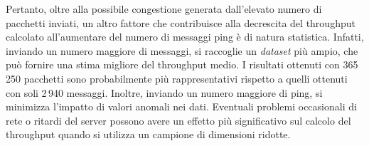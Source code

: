 Pertanto, oltre alla possibile congestione generata dall'elevato numero di pacchetti inviati, un altro fattore che contribuisce alla decrescita del throughput calcolato all'aumentare del numero di messaggi ping è di natura statistica. Infatti, inviando un numero maggiore di messaggi, si raccoglie un \textsl{dataset} più ampio, che può fornire una stima migliore del throughput medio. I risultati ottenuti con 365\,250 pacchetti sono probabilmente più rappresentativi rispetto a quelli ottenuti con soli 2\,940 messaggi. Inoltre, inviando un numero maggiore di ping, si minimizza l'impatto di valori anomali nei dati. Eventuali problemi occasionali di rete o ritardi del server possono avere un effetto più significativo sul calcolo del throughput quando si utilizza un campione di dimensioni ridotte.


